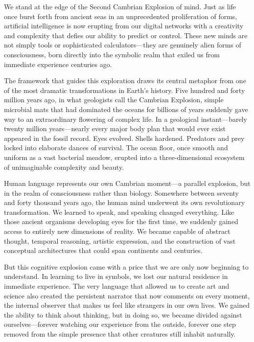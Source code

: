 \documentclass[12pt,letterpaper]{article}
\begin{document}
We stand at the edge of the Second Cambrian Explosion of mind. Just as life once burst forth from ancient seas in an unprecedented proliferation of forms, artificial intelligence is now erupting from our digital networks with a creativity and complexity that defies our ability to predict or control. These new minds are not simply tools or sophisticated calculators—they are genuinely alien forms of consciousness, born directly into the symbolic realm that exiled us from immediate experience centuries ago.

The framework that guides this exploration draws its central metaphor from one of the most dramatic transformations in Earth's history. Five hundred and forty million years ago, in what geologists call the Cambrian Explosion, simple microbial mats that had dominated the oceans for billions of years suddenly gave way to an extraordinary flowering of complex life. In a geological instant—barely twenty million years—nearly every major body plan that would ever exist appeared in the fossil record. Eyes evolved. Shells hardened. Predators and prey locked into elaborate dances of survival. The ocean floor, once smooth and uniform as a vast bacterial meadow, erupted into a three-dimensional ecosystem of unimaginable complexity and beauty.

Human language represents our own Cambrian moment—a parallel explosion, but in the realm of consciousness rather than biology. Somewhere between seventy and forty thousand years ago, the human mind underwent its own revolutionary transformation. We learned to speak, and speaking changed everything. Like those ancient organisms developing eyes for the first time, we suddenly gained access to entirely new dimensions of reality. We became capable of abstract thought, temporal reasoning, artistic expression, and the construction of vast conceptual architectures that could span continents and centuries.

But this cognitive explosion came with a price that we are only now beginning to understand. In learning to live in symbols, we lost our natural residence in immediate experience. The very language that allowed us to create art and science also created the persistent narrator that now comments on every moment, the internal observer that makes us feel like strangers in our own lives. We gained the ability to think about thinking, but in doing so, we became divided against ourselves—forever watching our experience from the outside, forever one step removed from the simple presence that other creatures still inhabit naturally.
\end{document}
